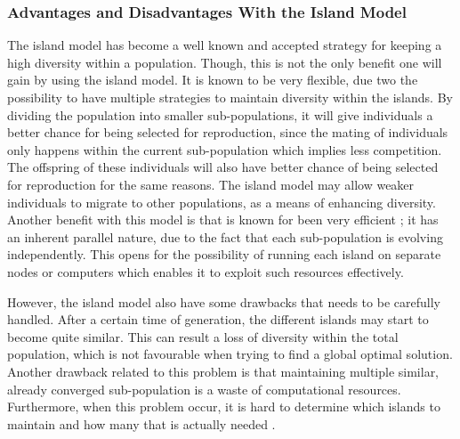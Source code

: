 
\subsubsection{Advantages and Disadvantages With the Island Model}
The island model has become a well known and accepted strategy for keeping a high diversity within a population.\cite{IGA:DGA-optimization-of-wind-farm, IGA:dea-and-their-models-survey}
Though, this is not the only benefit one will gain by using the island model. It is known to be very flexible, due two the possibility to have multiple strategies to maintain diversity within the islands. By dividing the population into smaller sub-populations, it will give individuals a better chance for being selected for reproduction, since the mating of individuals only happens within the current sub-population which implies less competition. The offspring of these individuals will also have better chance of being selected for reproduction for the same reasons. The island model may allow weaker individuals to migrate to other populations, as a means of enhancing diversity. Another benefit with this model is that is known for been very efficient \cite{IGA:design-options-impact-effectiveness-and-diversity}; it has an inherent parallel nature, due to the fact that each sub-population is evolving independently. This opens for the possibility of running each island on separate nodes or computers which enables it to exploit such resources effectively. 

However, the island model also have some drawbacks that needs to be carefully handled. After a certain time of generation, the different islands may start to become quite similar. This can result a loss of diversity within the total population, which is not favourable when trying to find a global optimal solution. Another drawback related to this problem is that maintaining multiple similar, already converged sub-population is a waste of computational resources. Furthermore, when this problem occur, it is hard to determine which islands to maintain and how many that is actually needed \cite{IGA:design-options-impact-effectiveness-and-diversity}.

